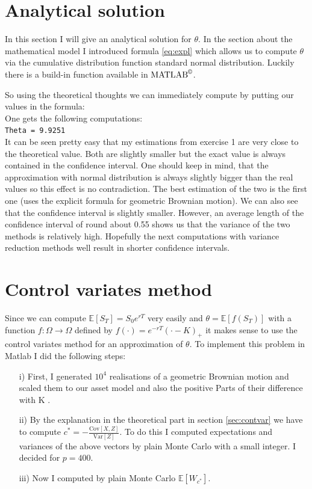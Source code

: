 \documentclass[12pt,a4paper]{scrartcl}
\begin{document}
\section{Analytical solution}
In this section I will give an analytical solution for $\theta$. In the section about the mathematical model I introduced formula \ref{eq:expl} which allows us to compute $\theta$ via the cumulative distribution function standard normal distribution. Luckily there is a build-in function available in $\text{MATLAB}^\copyright$.

\noindent So using the theoretical thoughts we can immediately compute by putting our values in the formula:\\

\noindent One gets the following computations:\\
\texttt{Theta = 9.9251}\\

\noindent It can be seen pretty easy that my estimations from exercise 1 are very close to the theoretical value. Both are slightly smaller but the exact value is always contained in the confidence interval. One should keep in mind, that the approximation with normal distribution is always slightly bigger than  the real values so this effect is no contradiction. The best estimation of the two is the first one (uses the explicit formula for geometric Brownian motion). We can also see that the confidence interval is slightly smaller. 
However, an average length of the confidence interval of round about 0.55 shows us that the variance of the two methods is relatively high. Hopefully the next computations with variance reduction methods well result in shorter confidence intervals.

\section{Control variates method}
Since we can compute $\mathbb{E}[S_T] = S_0 e^{rT}$ very easily and $\theta = \mathbb{E}[f(S_T)]$ with a function $f: \Omega \rightarrow \Omega$ defined by $f(\cdot) = e^{-rT}(\cdot - K)_+$ it makes sense to use the control variates method for an approximation of $\theta$.
To implement this problem in Matlab I did the following steps:
\begin{enumerate}
\item[i)] First, I generated $10^4$ realisations of a geometric Brownian motion and scaled them to our asset model and also the positive Parts of their difference with K .
\item[ii)] By the explanation in the theoretical part in section \ref{sec:contvar} we have to compute $c^* =  - \frac{\text{Cov}[X,Z]}{\text{Var}[Z]}$. To do this I computed expectations and variances of the above vectors by plain Monte Carlo with a small integer. I decided for $p = 400$.
\item[iii)] Now I computed by plain Monte Carlo $\mathbb{E}[W_{c^*}]$.
\end{enumerate}
\end{document}
